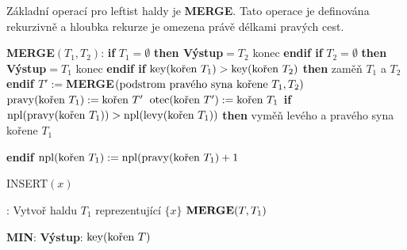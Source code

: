 \documentclass[a4paper,12pt]{article}
\DeclareMathOperator*{\otec}{otec}
\DeclareMathOperator*{\levy}{levy}
\DeclareMathOperator*{\pravy}{pravy}
\DeclareMathOperator*{\key}{key}
\DeclareMathOperator*{\npl}{npl}
\begin{document}
Základní operací pro leftist haldy je {\bf MERGE}. Tato 
operace je definována rekurzivně a hloubka rekurze je omezena 
právě délkami pravých cest.

{\bf MERGE$(T_1,T_2)$}:\newline 
{\bf if} $T_1=\emptyset$ {\bf then Výstup$=T_2$} konec {\bf endif\newline 
if} $T_2=\emptyset$ {\bf then Výstup$=T_1$} konec {\bf endif\newline 
if} $\key(\text{\rm kořen }T_1)>\key(\text{\rm kořen }T_2)$ {\bf then\newline 
\phantom{{\rm ---}}}zaměň $T_1$ a $T_2$\newline 
{\bf endif\newline 
$T':=$MERGE$(\text{{{\rm podstrom pravého syna kořene }}}T_1
,T_2)$\newline 
$\pravy(\text{\rm{{\rm kořen }}}T_1):=\text{\rm{{\rm kořen }}}
T'$\newline 
$\otec(\text{\rm {\rm kořen }}T'):=\text{\rm {\rm kořen }}T_
1$\newline 
if} $\npl(\pravy(\text{\rm kořen }T_1))>\npl(\levy(\text{\rm kořen }
T_1))$ {\bf then\newline 
\phantom{{\rm ---}}}vyměň levého a pravého syna kořene $
T_1$\newline 
{\bf endif\newline 
$\npl(\text{{\rm {\rm kořen }}}T_1):=\npl(\pravy(\text{{\rm {\rm kořen }}}
T_1)+1$

INSERT$(x)$}:\newline 
Vytvoř haldu $T_1$ reprezentující $\{x\}$\newline 
$\bold M\bold E\bold R\bold G\bold E(T,T_1)$

{\bf MIN}:\newline 
{\bf Výstup}: $\key(\text{\rm kořen }T)$
\end{document}

